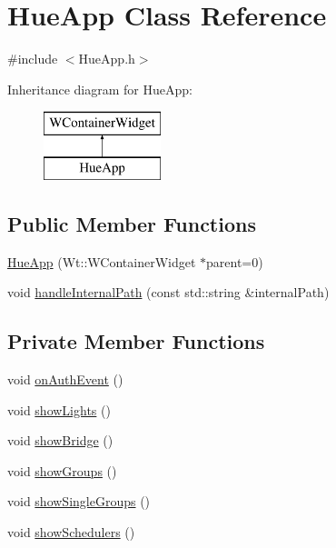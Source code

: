 \hypertarget{class_hue_app}{}\section{Hue\+App Class Reference}
\label{class_hue_app}


{\ttfamily \#include $<$Hue\+App.\+h$>$}

Inheritance diagram for Hue\+App\+:\begin{figure}[H]
\begin{center}
\leavevmode
\includegraphics[height=2.000000cm]{class_hue_app}
\end{center}
\end{figure}
\subsection*{Public Member Functions}
\begin{DoxyCompactItemize}
\item 
\hyperlink{class_hue_app_a34bbbd56837e397473a85d9d6adc99fa}{Hue\+App} (Wt\+::\+W\+Container\+Widget $\ast$parent=0)
\item 
void \hyperlink{class_hue_app_a434baacf5c3e79b09cbedf8057060cbb}{handle\+Internal\+Path} (const std\+::string \&internal\+Path)
\end{DoxyCompactItemize}
\subsection*{Private Member Functions}
\begin{DoxyCompactItemize}
\item 
void \hyperlink{class_hue_app_af349923ea5d293c0226efd3ef71f4616}{on\+Auth\+Event} ()
\item 
void \hyperlink{class_hue_app_a3f5ea7541b2a416acd0b9f4e94073e72}{show\+Lights} ()
\item 
void \hyperlink{class_hue_app_a9e30cb9f84bfdc63261c6273cf07d5b1}{show\+Bridge} ()
\item 
void \hyperlink{class_hue_app_a05c48b318d651f27237ab6fc3c66c33b}{show\+Groups} ()
\item 
void \hyperlink{class_hue_app_a096902db63e23b1efb5756010af69209}{show\+Single\+Groups} ()
\item 
void \hyperlink{class_hue_app_a889374816e88dddf42d7dc44732dbc3a}{show\+Schedulers} ()
\end{DoxyCompactItemize}
